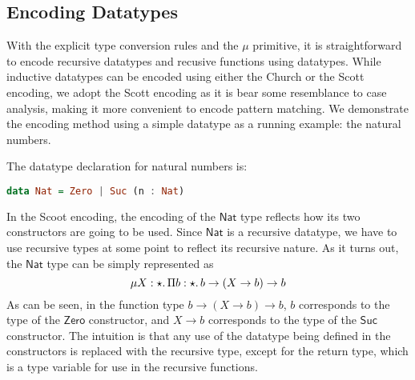 \subsection{Encoding Datatypes}


\newcommand{\Nat}{\mathsf{Nat}} \newcommand{\zero}{\mathsf{Zero}}
\newcommand{\suc}{\mathsf{Suc}} \newcommand{\plus}{\mathsf{plus}}
\newcommand{\List}{\mathsf{List}} \newcommand{\nil}{\mathsf{nil}}
\newcommand{\cons}{\mathsf{cons}}
\newcommand{\length}{\mathsf{length}}
\newcommand{\case}{\mathbf{case}} \newcommand{\of}{\mathbf{of}}
\newcommand{\data}{\mathbf{data}} \newcommand{\where}{\mathbf{where}}
\newcommand{\letbb}{\mathbf{let}} \newcommand{\inb}{\mathbf{in}}

With the explicit type conversion rules and the $\mu$ primitive, it is straightforward to encode recursive datatypes and recusive functions using datatypes. While inductive datatypes can be encoded using either the Church or the Scott encoding, we adopt the Scott encoding as it is bear some resemblance to case analysis, making it more convenient to encode pattern matching. We demonstrate the encoding method using a simple datatype as a running example: the natural numbers.

The datatype declaration for natural numbers is:
\begin{lstlisting}[language=Haskell]
  data Nat = Zero | Suc (n : Nat)
\end{lstlisting}
In the Scoot encoding, the encoding of the $\Nat$ type reflects how its two constructors are going to be used. Since $\Nat$ is a recursive datatype, we have to use recursive types at some point to reflect its recursive nature. As it turns out, the $\Nat$ type can be simply represented as
\[\mu X:\star.\,\Pi b:\star.\,b \rightarrow (X \rightarrow b) \rightarrow b\]
As can be seen, in the function type $b \rightarrow (X \rightarrow b) \rightarrow b$, $b$ corresponds to the type of the $\zero$ constructor, and $X \rightarrow b$ corresponds to the type of the $\suc$ constructor. The intuition is that any use of the datatype being defined in the constructors is replaced with the recursive type, except for the return type, which is a type variable for use in the recursive functions.

